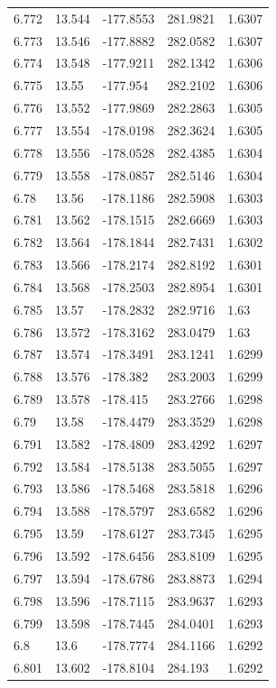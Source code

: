 \begin{tabular}{lllll}
6.772 & 13.544 & -177.8553 & 281.9821 & 1.6307 \\
6.773 & 13.546 & -177.8882 & 282.0582 & 1.6307 \\
6.774 & 13.548 & -177.9211 & 282.1342 & 1.6306 \\
6.775 & 13.55 & -177.954 & 282.2102 & 1.6306 \\
6.776 & 13.552 & -177.9869 & 282.2863 & 1.6305 \\
6.777 & 13.554 & -178.0198 & 282.3624 & 1.6305 \\
6.778 & 13.556 & -178.0528 & 282.4385 & 1.6304 \\
6.779 & 13.558 & -178.0857 & 282.5146 & 1.6304 \\
6.78 & 13.56 & -178.1186 & 282.5908 & 1.6303 \\
6.781 & 13.562 & -178.1515 & 282.6669 & 1.6303 \\
6.782 & 13.564 & -178.1844 & 282.7431 & 1.6302 \\
6.783 & 13.566 & -178.2174 & 282.8192 & 1.6301 \\
6.784 & 13.568 & -178.2503 & 282.8954 & 1.6301 \\
6.785 & 13.57 & -178.2832 & 282.9716 & 1.63 \\
6.786 & 13.572 & -178.3162 & 283.0479 & 1.63 \\
6.787 & 13.574 & -178.3491 & 283.1241 & 1.6299 \\
6.788 & 13.576 & -178.382 & 283.2003 & 1.6299 \\
6.789 & 13.578 & -178.415 & 283.2766 & 1.6298 \\
6.79 & 13.58 & -178.4479 & 283.3529 & 1.6298 \\
6.791 & 13.582 & -178.4809 & 283.4292 & 1.6297 \\
6.792 & 13.584 & -178.5138 & 283.5055 & 1.6297 \\
6.793 & 13.586 & -178.5468 & 283.5818 & 1.6296 \\
6.794 & 13.588 & -178.5797 & 283.6582 & 1.6296 \\
6.795 & 13.59 & -178.6127 & 283.7345 & 1.6295 \\
6.796 & 13.592 & -178.6456 & 283.8109 & 1.6295 \\
6.797 & 13.594 & -178.6786 & 283.8873 & 1.6294 \\
6.798 & 13.596 & -178.7115 & 283.9637 & 1.6293 \\
6.799 & 13.598 & -178.7445 & 284.0401 & 1.6293 \\
6.8 & 13.6 & -178.7774 & 284.1166 & 1.6292 \\
6.801 & 13.602 & -178.8104 & 284.193 & 1.6292 \\

\end{tabular}
